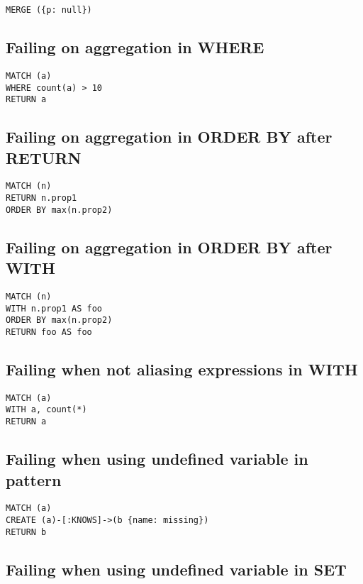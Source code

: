 \begin{lstlisting}
MERGE ({p: null})
\end{lstlisting}

\subsection{Failing on aggregation in WHERE}

\begin{lstlisting}
MATCH (a)
WHERE count(a) > 10
RETURN a
\end{lstlisting}

\subsection{Failing on aggregation in ORDER BY after RETURN}

\begin{lstlisting}
MATCH (n)
RETURN n.prop1
ORDER BY max(n.prop2)
\end{lstlisting}

\subsection{Failing on aggregation in ORDER BY after WITH}

\begin{lstlisting}
MATCH (n)
WITH n.prop1 AS foo
ORDER BY max(n.prop2)
RETURN foo AS foo
\end{lstlisting}

\subsection{Failing when not aliasing expressions in WITH}

\begin{lstlisting}
MATCH (a)
WITH a, count(*)
RETURN a
\end{lstlisting}

\subsection{Failing when using undefined variable in pattern}

\begin{lstlisting}
MATCH (a)
CREATE (a)-[:KNOWS]->(b {name: missing})
RETURN b
\end{lstlisting}

\subsection{Failing when using undefined variable in SET}

